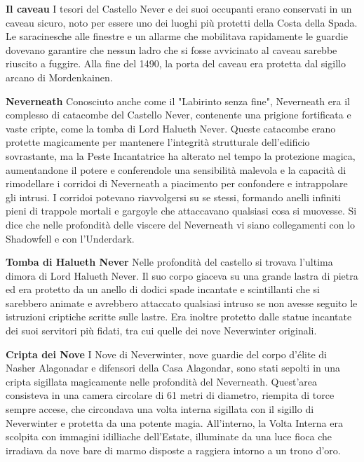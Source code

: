 \documentclass{article}
\begin{document}
\textbf{Il caveau}
I tesori del Castello Never e dei suoi occupanti erano conservati in un caveau sicuro, noto per essere uno dei luoghi più protetti della Costa della Spada. Le saracinesche alle finestre e un allarme che mobilitava rapidamente le guardie dovevano garantire che nessun ladro che si fosse avvicinato al caveau sarebbe riuscito a fuggire. Alla fine del 1490, la porta del caveau era protetta dal sigillo arcano di Mordenkainen.

\textbf{Neverneath}
Conosciuto anche come il "Labirinto senza fine", Neverneath era il complesso di catacombe del Castello Never, contenente una prigione fortificata e vaste cripte, come la tomba di Lord Halueth Never. Queste catacombe erano protette magicamente per mantenere l'integrità strutturale dell'edificio sovrastante, ma la Peste Incantatrice ha alterato nel tempo la protezione magica, aumentandone il potere e conferendole una sensibilità malevola e la capacità di rimodellare i corridoi di Neverneath a piacimento per confondere e intrappolare gli intrusi. I corridoi potevano riavvolgersi su se stessi, formando anelli infiniti pieni di trappole mortali e gargoyle che attaccavano qualsiasi cosa si muovesse. Si dice che nelle profondità delle viscere del Neverneath vi siano collegamenti con lo Shadowfell e con l'Underdark.


\textbf{Tomba di Halueth Never}
Nelle profondità del castello si trovava l'ultima dimora di Lord Halueth Never. Il suo corpo giaceva su una grande lastra di pietra ed era protetto da un anello di dodici spade incantate e scintillanti che si sarebbero animate e avrebbero attaccato qualsiasi intruso se non avesse seguito le istruzioni criptiche scritte sulle lastre. Era inoltre protetto dalle statue incantate dei suoi servitori più fidati, tra cui quelle dei nove Neverwinter originali.

\textbf{Cripta dei Nove}
I Nove di Neverwinter, nove guardie del corpo d'élite di Nasher Alagonadar e difensori della Casa Alagondar, sono stati sepolti in una cripta sigillata magicamente nelle profondità del Neverneath. Quest'area consisteva in una camera circolare di 61 metri di diametro, riempita di torce sempre accese, che circondava una volta interna sigillata con il sigillo di Neverwinter e protetta da una potente magia. All'interno, la Volta Interna era scolpita con immagini idilliache dell'Estate, illuminate da una luce fioca che irradiava da nove bare di marmo disposte a raggiera intorno a un trono d'oro.
\end{document}
